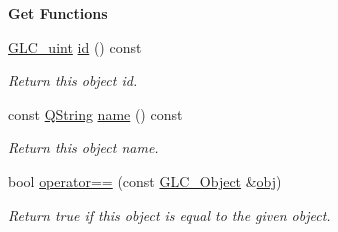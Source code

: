 \begin{Indent}{\bf Get Functions}\par
\begin{DoxyCompactItemize}
\item 
\hyperlink{glc__global_8h_abf950976fabed69026558df8e2da6c6b}{G\-L\-C\-\_\-uint} \hyperlink{class_g_l_c___object_ad202d773de8c8d760399e4d4cc40b2e1}{id} () const 
\begin{DoxyCompactList}\small\item\em Return this object id. \end{DoxyCompactList}\item 
const \hyperlink{group___u_a_v_objects_plugin_gab9d252f49c333c94a72f97ce3105a32d}{Q\-String} \hyperlink{class_g_l_c___object_a5f7f198bba887174ee760435292a3c6f}{name} () const 
\begin{DoxyCompactList}\small\item\em Return this object name. \end{DoxyCompactList}\item 
bool \hyperlink{class_g_l_c___object_a84499a2326e74954a2fef3560ffbcb32}{operator==} (const \hyperlink{class_g_l_c___object}{G\-L\-C\-\_\-\-Object} \&\hyperlink{glext_8h_a0c0d4701a6c89f4f7f0640715d27ab26}{obj})
\begin{DoxyCompactList}\small\item\em Return true if this object is equal to the given object. \end{DoxyCompactList}\end{DoxyCompactItemize}
\end{Indent}
